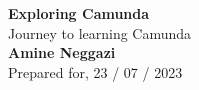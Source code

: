 \begin{titlepage}
    \begin{center}
    {\fontsize{36}{42}\selectfont \bfseries Exploring Camunda} 
    \\\vspace{20pt}
    {\LARGE Journey to learning Camunda} \\
    \vspace{20pt}
    \textbf{Amine Neggazi}
    \vspace{8pt}
    \\Prepared for, 23 / 07 / 2023
    \end{center}
\end{titlepage}
